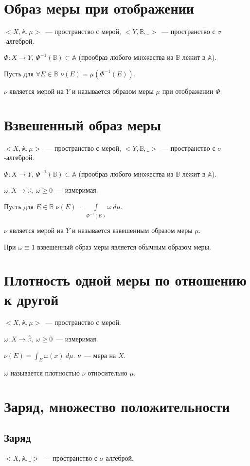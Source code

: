 \documentclass[paper=a4, fontsize=17pt]{article}
\begin{document}
	\section{Образ меры при отображении}
	$<X, \mathds{A}, \mu>$~--- пространство с мерой, $<Y, \mathds{B}, \_>$~--- пространство с $\sigma$-алгеброй.

	$\Phi: X \to Y$, $\Phi^{-1}(\mathds{B}) \subset \mathds{A}$ (прообраз любого множества из $\mathds{B}$ лежит в $\mathds{A}$).

	Пусть для $\forall E \in \mathds{B}$ $\nu(E) = \mu(\Phi^{-1}(E))$.

	$\nu$ является мерой на $Y$ и называется образом меры $\mu$ при отображении $\Phi$.

	\section{Взвешенный образ меры}
	$<X, \mathds{A}, \mu>$~--- пространство с мерой, $<Y, \mathds{B}, \_>$~--- пространство с $\sigma$-алгеброй.

	$\Phi: X \to Y$, $\Phi^{-1}(\mathds{B}) \subset \mathds{A}$ (прообраз любого множества из $\mathds{B}$ лежит в $\mathds{A}$).

	$\omega: X \to \overline{\mathds{R}}$, $\omega \geq 0$~--- измеримая.

	Пусть для $E \in \mathds{B}$ $\nu(E) = \int\limits_{\Phi^{-1}(E)} \omega~d\mu$.

	$\nu$ является мерой на $Y$ и называется взвешенным образом меры $\mu$.

	При $\omega \equiv 1$ взвешенный образ меры является обычным образом меры.

	\section{Плотность одной меры по отношению к другой}
	$<X, \mathds{A}, \mu>$~--- пространство с мерой.

	$\omega: X \to \overline{\mathds{R}}$, $\omega \geq 0$~--- измеримая.

	$\nu(E) = \int_E \omega(x)~d\mu$. $\nu$~--- мера на $X$.

	$\omega$ называется плотностью $\nu$ относительно $\mu$.

	\section{Заряд, множество положительности}
	\subsection{Заряд}
	$<X, \mathds{A}, \_>$~--- пространство с $\sigma$-алгеброй.
\end{document}
